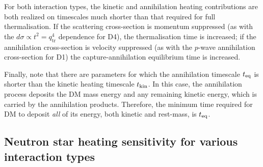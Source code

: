 For both interaction types, the kinetic and annihilation heating contributions are both realized on timescales much shorter than that required for full thermalisation. If the scattering cross-section is momentum suppressed (as with the $d\sigma \propto t^2=q_\text{tr}^4$ dependence for D4), the thermalisation time is increased; if the annihilation cross-section is velocity suppressed (as with the $p$-wave annihilation cross-section for D1) the capture-annihilation equilibrium time is increased.


 
Finally, note that there are parameters for which the annihilation timescale $t_{\rm eq}$ is shorter than the kinetic heating timescale $t_{\rm kin}$. In this case, the annihilation process deposits the DM mass energy and any remaining kinetic energy, which is carried by the annihilation products. Therefore, the minimum time required for DM to deposit {\it all} of its energy, both kinetic and rest-mass, is $t_{\rm eq}$.


\subsection{Neutron star heating sensitivity for various interaction types}   
\label{ref:heatingresults}


